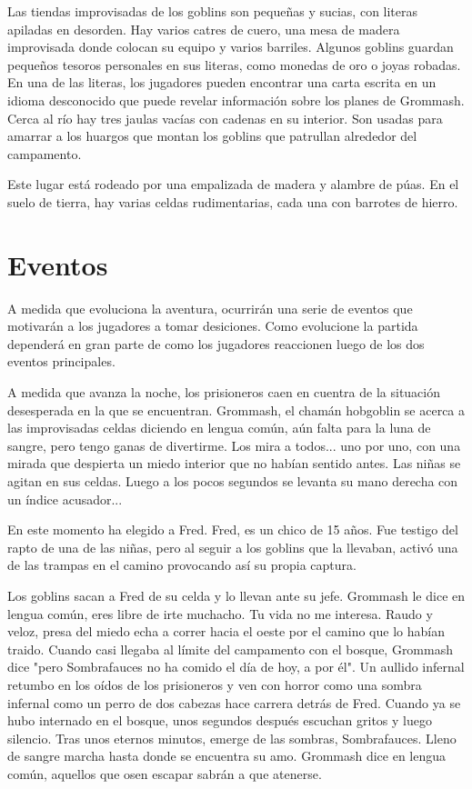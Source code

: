 \documentclass[10pt,twoside,twocolumn,openany]{dndbook}
\begin{document}
Las tiendas improvisadas de los goblins son pequeñas y sucias, con literas apiladas en desorden. Hay 
varios catres de cuero, una mesa de madera improvisada donde colocan su equipo y varios barriles. 
Algunos goblins guardan pequeños tesoros personales en sus literas, como monedas de oro o joyas robadas.
En una de las literas, los jugadores pueden encontrar una carta escrita en un idioma desconocido que 
puede revelar información sobre los planes de Grommash. Cerca al río hay tres jaulas vacías con cadenas 
en su interior. Son usadas para amarrar a los huargos que montan los goblins que patrullan alrededor
del campamento.

Este lugar está rodeado por una empalizada de madera y alambre de púas. En el suelo de tierra, hay 
varias celdas rudimentarias, cada una con barrotes de hierro. 

\section{Eventos}
A medida que evoluciona la aventura, ocurrirán una serie de eventos que motivarán a los jugadores a 
tomar desiciones. Como evolucione la partida dependerá en gran parte de como los jugadores reaccionen 
luego de los dos eventos principales.

\begin{DndReadAloud}
  A medida que avanza la noche, los prisioneros caen en cuentra de la situación desesperada en la que 
  se encuentran. Grommash, el chamán hobgoblin se acerca a las improvisadas celdas diciendo en lengua 
  común, aún falta para la luna de sangre, pero tengo ganas de divertirme. Los mira a todos... 
  uno por uno, con una mirada que despierta un miedo interior que no habían sentido antes. Las niñas 
  se agitan en sus celdas. Luego a los pocos segundos se levanta su mano derecha con un índice acusador...
\end{DndReadAloud}

En este momento ha elegido a Fred. Fred, es un chico de 15 años. Fue testigo del rapto de una de las 
niñas, pero al seguir a los goblins que la llevaban, activó una de las trampas en el camino provocando 
así su propia captura.

\begin{DndReadAloud}
Los goblins sacan a Fred de su celda y lo llevan ante su jefe. Grommash le dice en lengua común, eres 
libre de irte muchacho. Tu vida no me interesa. Raudo y veloz, presa del miedo echa a correr hacia el 
oeste por el camino que lo habían traido. Cuando casi llegaba al límite del campamento con el bosque, 
Grommash dice "pero Sombrafauces no ha comido el día de hoy, a por él". Un aullido infernal retumbo 
en los oídos de los prisioneros y ven con horror como una sombra infernal como un perro de dos cabezas 
hace carrera detrás de Fred. Cuando ya se hubo internado en el bosque, unos segundos después escuchan 
gritos y luego silencio. Tras unos eternos minutos, emerge de las sombras, Sombrafauces. Lleno de sangre 
marcha hasta donde se encuentra su amo. Grommash dice en lengua común, aquellos que osen escapar 
sabrán a que atenerse.
\end{DndReadAloud}
\end{document}
